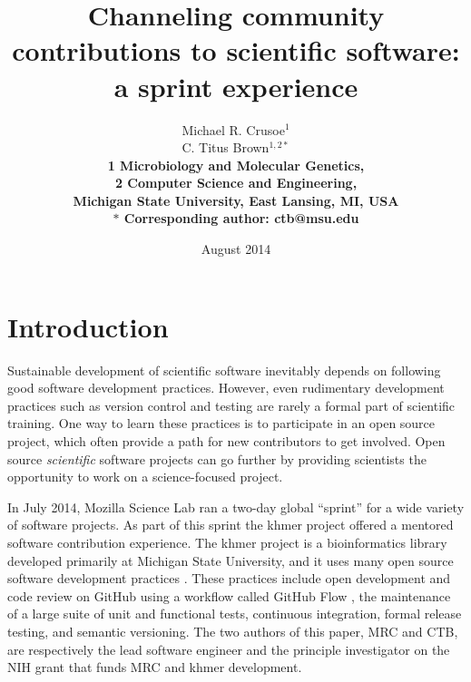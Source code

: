 \documentclass[11pt]{article}
\date{August 2014}
\title{Channeling community contributions to scientific software: a sprint experience}
\author{Michael R. Crusoe$^{1}$\\
C. Titus Brown$^{1,2\ast}$\\
\small \bf{1} Microbiology and Molecular Genetics,\\
\small \bf{2} Computer Science and Engineering,\\
\small Michigan State University, East Lansing, MI, USA\\
\small $\ast$ Corresponding author: ctb@msu.edu}
\begin{document}
\maketitle
\thispagestyle{firststyle}


\setlength{\parindent}{0pt}
\setlength{\parindent}{0pt}
\setlength{\parskip}{0.70ex}

\section{Introduction}

Sustainable development of scientific software inevitably depends on
following good software development practices.  However, even
rudimentary development practices such as version control and testing
are rarely a formal part of scientific training.  One way to learn
these practices is to participate in an open source project, which
often provide a path for new contributors to get involved.  Open
source {\em scientific} software projects can go further by providing
scientists the opportunity to work on a science-focused project.

In July 2014, Mozilla Science Lab ran a two-day global ``sprint'' for
a wide variety of software projects. As part of this sprint the khmer
project offered a mentored software contribution experience.  The
khmer project is a bioinformatics library developed primarily at
Michigan State University, and it uses many open source software
development practices \cite{khmer,2013-wssspe13}.  These practices
include open development and code review on GitHub using a workflow
called GitHub Flow \cite{githubflow}, the maintenance of a large suite
of unit and functional tests, continuous integration, formal release
testing, and semantic versioning.  The two authors of this paper, MRC
and CTB, are respectively the lead software engineer and the principle
investigator on the NIH grant that funds MRC and khmer development.
\end{document}
